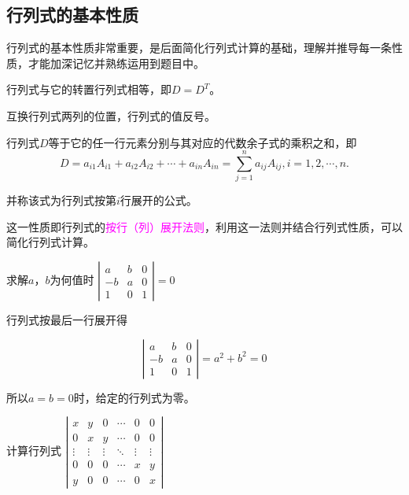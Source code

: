 \subsection{行列式的基本性质}

行列式的基本性质非常重要，是后面简化行列式计算的基础，理解并推导每一条性质，才能加深记忆并熟练运用到题目中。

\begin{property}
    行列式与它的转置行列式相等，即$D=D^{T}$。
\end{property}

\begin{property}
    互换行列式两列的位置，行列式的值反号。
\end{property}

\begin{property}
    行列式$D$等于它的任一行元素分别与其对应的代数余子式的乘积之和，即
    $$ D=a_{i1}A_{i1}+a_{i2}A_{i2} +\cdots +a_{in}A_{in}= \sum_{j=1}^{n}a_{ij}A_{ij},  i=1,2,\cdots,n.
    $$

    并称该式为行列式按第$i$行展开的公式。
\end{property}

这一性质即行列式的\textcolor{magenta}{按行（列）展开法则}，利用这一法则并结合行列式性质，可以简化行列式计算。

\begin{example}
    求解$a$，$b$为何值时
    $ \left|\begin{array}{ccc}
            a  & b & 0 \\
            -b & a & 0 \\
            1  & 0 & 1
        \end{array}\right| =0 $
\end{example}
\begin{solution}
    行列式按最后一行展开得

    $$ \left|\begin{array}{ccc}
            a  & b & 0 \\
            -b & a & 0 \\
            1  & 0 & 1
        \end{array}\right| =a^{2}+b^{2} =0$$

    所以$a=b=0$时，给定的行列式为零。
\end{solution}

\begin{example}[课后题6.(2)]
    计算行列式
    $ \left|\begin{array}{cccccc}
            x      & y      & 0      & \cdots & 0      & 0      \\
            0      & x      & y      & \cdots & 0      & 0      \\
            \vdots & \vdots & \vdots & \ddots & \vdots & \vdots \\
            0      & 0      & 0      & \cdots & x      & y      \\
            y      & 0      & 0      & \cdots & 0      & x
        \end{array}\right|  $
\end{example}

